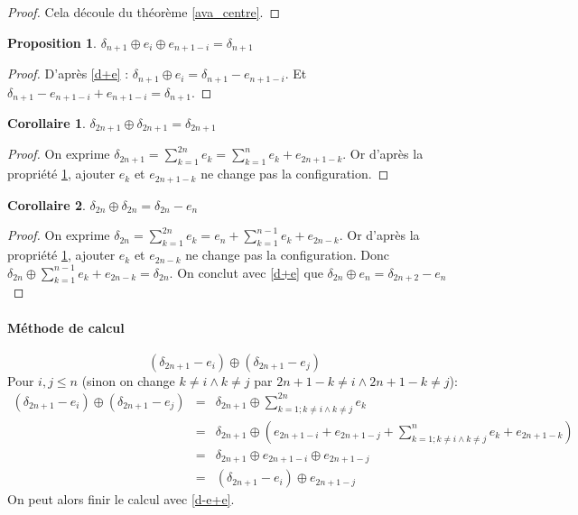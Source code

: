 \documentclass{report}
\newtheorem{property}[theorem]{Proposition}
\newtheorem{corollary}{Corollaire}[theorem]
\newcommand{\plus}{\ensuremath{\oplus}}
\begin{document}
\begin{proof}
Cela découle du théorème \ref{ava_centre}. 
\end{proof}

\begin{property} \label{lemme1}
$\delta_{n+1} \plus e_i \plus e_{n+1-i} = \delta_{n+1}$
\end{property}
\begin{proof}
D'après \ref{d+e} : $\delta_{n+1} \plus e_i = \delta_{n+1} - e_{n+1-i}$. Et $\delta_{n+1} - e_{n+1-i} + e_{n+1-i} = \delta_{n+1}$.
\end{proof}

\begin{corollary} 
$\delta_{2n+1} \plus \delta_{2n+1} = \delta_{2n+1}$
\end{corollary}
\begin{proof}
On exprime $\delta_{2n+1} = \sum_{k=1}^{2n}e_k = \sum_{k=1}^{n}e_k + e_{2n+1-k}$. Or d'après la propriété \ref{lemme1}, ajouter $e_k$ et $e_{2n+1-k}$ ne change pas la configuration.
\end{proof}

\begin{corollary} 
$\delta_{2n} \plus \delta_{2n} = \delta_{2n} - e_n$
\end{corollary}
\begin{proof}
On exprime $\delta_{2n} = \sum_{k=1}^{2n}e_k = e_n + \sum_{k=1}^{n-1}e_k + e_{2n-k}$. Or d'après la propriété \ref{lemme1}, ajouter $e_k$ et $e_{2n-k}$ ne change pas la configuration. Donc $\delta_{2n} \plus{} \sum_{k=1}^{n-1}e_k + e_{2n-k} = \delta_{2n}$. On conclut avec \ref{d+e} que $\delta_{2n} \plus{} e_n = \delta_{2n+2} - e_n$
\end{proof}

\paragraph{Méthode de calcul}
$$(\delta_{2n+1} - e_i) \plus{} (\delta_{2n+1} - e_j)$$
Pour $i, j \leq n$ (sinon on change $k \not=i \land k \not=j$ par $2n+1-k \not=i \land 2n+1-k \not=j$):
\begin{eqnarray}
(\delta_{2n+1} - e_i) \plus{} (\delta_{2n+1} - e_j) 
&=& \delta_{2n+1} \plus{} \sum_{k=1; k \not=i \land k \not=j}^{2n} e_k\\
&=& \delta_{2n+1} \plus{} (e_{2n+1-i} + e_{2n+1-j} + \sum_{k=1; k \not=i \land k \not=j}^{n} e_k + e_{2n+1 - k})\\
&=& \delta_{2n+1} \plus{} e_{2n+1-i} \plus{} e_{2n+1-j}\\
&=& (\delta_{2n+1} - e_i) \plus{} e_{2n+1-j}
\end{eqnarray}
On peut alors finir le calcul avec \ref{d-e+e}.
\end{document}
